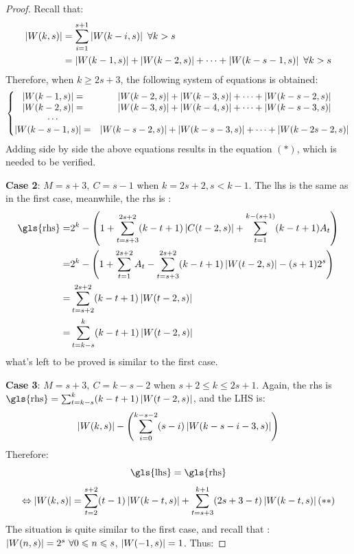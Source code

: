 \begin{proof}
    Recall that:
    \begin{align*}
        \left \lvert W(k,s) \right \rvert &= \sum_{i=1}^{s+1}\left \lvert  W(k-i,s) \right \rvert\ \forall k>s\\
        &=\left \lvert  W(k-1,s) \right \rvert+\left \lvert  W(k-2,s) \right \rvert + \cdots + \left \lvert  W(k-s-1,s) \right \rvert\ \forall k>s
    \end{align*}
    Therefore, when $k\geq2s+3$, the following system of equations is obtained:
    \[\left\{\begin{matrix}
        \left \lvert  W(k-1,s) \right \rvert = &\left \lvert  W(k-2,s) \right \rvert + \left \lvert  W(k-3,s) \right \rvert+\cdots + \left \lvert  W(k-s-2,s) \right \rvert \\
        \left \lvert  W(k-2,s) \right \rvert = &\left \lvert  W(k-3,s) \right \rvert + \left \lvert  W(k-4,s) \right \rvert+\cdots + \left \lvert  W(k-s-3,s) \right \rvert \\
        \cdots \\
        \left \lvert  W(k-s-1,s) \right \rvert = &\left \lvert  W(k-s-2,s) \right \rvert + \left \lvert  W(k-s-3,s) \right \rvert+\cdots + \left \lvert  W(k-2s-2,s) \right \rvert
    \end{matrix}\right.\]
    Adding side by side the above equations results in the equation $(*)$, which is needed to be verified.
    
    \textbf{Case 2}: $M=s+3,\ C=s-1$ when $k=2s+2,s<k-1$. 
    The \gls{lhs} is the same as in the first case, meanwhile, the \gls{rhs} is :
    \begin{align*}
        \mathrm{\gls{rhs}} = &2^{k}-\left(1+\sum_{t=s+3}^{2s+2}(k-t+1)\card{ C(t-2,s)}+\sum_{t=1}^{k-(s+1)}(k-t+1)A_{t}\right) \\
        =&2^{k}-\left(1+\sum_{t=1}^{2s+2}A_{t}-\sum_{t=s+3}^{2s+2}(k-t+1)\card{ W(t-2,s)}-(s+1)2^{s}\right)\\
        =&\sum_{t=s+2}^{2s+2}(k-t+1)\card{ W(t-2,s)}\\
        =&\sum_{t=k-s}^{k}(k-t+1)\card{ W(t-2,s)}
    \end{align*}
    what's left to be proved is similar to the first case.
    
    \textbf{Case 3}: $M=s+3,\ C=k-s-2$ when $s+2\leq k\leq 2s+1$.
    Again, the \gls{rhs} is $\mathrm{\gls{rhs}} = \sum_{t=k-s}^{k}(k-t+1)\card{ W(t-2,s)}$, and the LHS is:
    \[\left \lvert  W(k,s) \right \rvert - \left(\sum_{i=0}^{k-s-2}(s-i)\left \lvert  W(k-s-i-3,s) \right \rvert \right)\]
    Therefore:
    \[\mathrm{\gls{lhs}} = \mathrm{\gls{rhs}}\]
    \[\Leftrightarrow \left \lvert  W(k,s) \right \rvert = \sum_{t=2}^{s+2}(t-1)\left \lvert  W(k-t,s) \right \rvert + \sum_{t=s+3}^{k+1}(2s+3-t)\left \lvert  W(k-t,s) \right \rvert (**)\]
    The situation is quite similar to the first case, and recall that : $\left \lvert  W(n,s)  \right \rvert = 2^{s}\ \forall 0\leqslant n\leqslant s$, $\left \lvert  W(-1,s) \right \rvert = 1$. Thus:
    

\end{proof}
